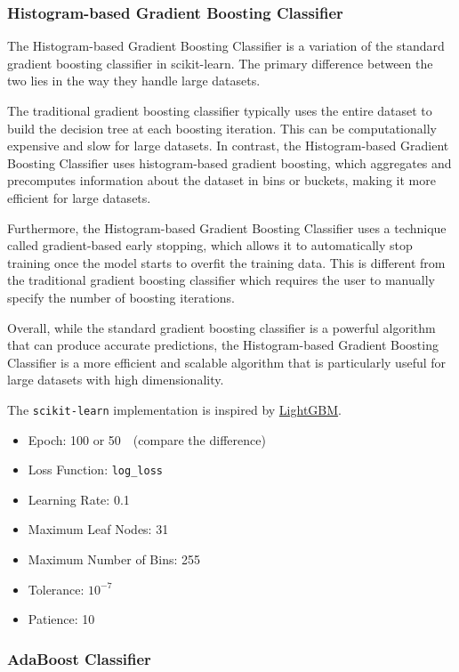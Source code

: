 \documentclass[twocolumn, draft]{extarticle}
\begin{document}
\subsubsection{Histogram-based Gradient Boosting Classifier}

The Histogram-based Gradient Boosting Classifier is a variation of the standard gradient boosting classifier in scikit-learn. The primary difference between the two lies in the way they handle large datasets.

The traditional gradient boosting classifier typically uses the entire dataset to build the decision tree at each boosting iteration. This can be computationally expensive and slow for large datasets. In contrast, the Histogram-based Gradient Boosting Classifier uses histogram-based gradient boosting, which aggregates and precomputes information about the dataset in bins or buckets, making it more efficient for large datasets.

Furthermore, the Histogram-based Gradient Boosting Classifier uses a technique called gradient-based early stopping, which allows it to automatically stop training once the model starts to overfit the training data. This is different from the traditional gradient boosting classifier which requires the user to manually specify the number of boosting iterations.

Overall, while the standard gradient boosting classifier is a powerful algorithm that can produce accurate predictions, the Histogram-based Gradient Boosting Classifier is a more efficient and scalable algorithm that is particularly useful for large datasets with high dimensionality.

The \texttt{scikit-learn} implementation is inspired by \href{https://github.com/Microsoft/LightGBM}{LightGBM}.

\begin{itemize}
\item Epoch: 100 or 50　(compare the difference)
\item Loss Function: \texttt{log\_loss}
\item Learning Rate: 0.1
\item Maximum Leaf Nodes: 31
\item Maximum Number of Bins: 255
\item Tolerance: $10^{-7}$
\item Patience: 10
\end{itemize}

\subsubsection{AdaBoost Classifier}
\end{document}
